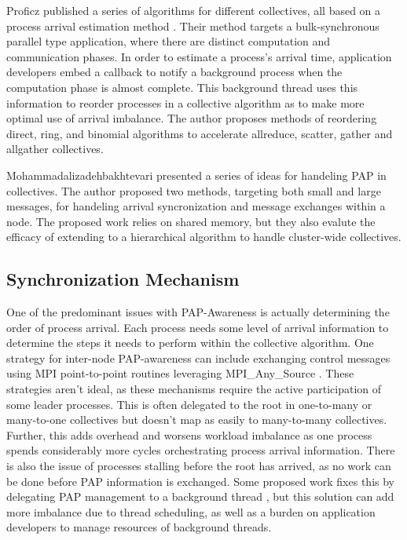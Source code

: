 Proficz published a series of algorithms for different collectives, all based on a process arrival estimation method \cite{Proficz2018ImprvAllReduceForImbPAP, Proficz2020PAPAwareScatterGather, Proficz2021AllGatherResilientToImbPAP}.
Their method targets a bulk-synchronous parallel type application, where there are distinct computation and communication phases.
In order to estimate a process's arrival time, application developers embed a callback to notify a background process when the computation phase is almost complete.
This background thread uses this information to reorder processes in a collective algorithm as to make more optimal use of arrival imbalance.
The author proposes methods of reordering direct, ring, and binomial algorithms to accelerate allreduce, scatter, gather and allgather collectives.

Mohammadalizadehbakhtevari \cite{Mohammadalizadehbakhtevari2021Thesis} presented a series of ideas for handeling PAP in collectives. 
The author proposed two methods, targeting both small and large messages, for handeling arrival syncronization and message exchanges within a node.
The proposed work relies on shared memory, but they also evalute the efficacy of extending to a hierarchical algorithm to handle cluster-wide collectives.

\subsection{Synchronization Mechanism}

One of the predominant issues with PAP-Awareness is actually determining the order of process arrival.
Each process needs some level of arrival information to determine the steps it needs to perform within the collective algorithm. 
One strategy for inter-node PAP-awareness can include exchanging control messages using MPI point-to-point routines leveraging MPI\_Any\_Source \cite{Patarasuk2008EffBcastDifProcArr}.
These strategies aren't ideal, as these mechanisms require the active participation of some leader processes.
This is often delegated to the root in one-to-many or many-to-one collectives but doesn't map as easily to many-to-many collectives.
Further, this adds overhead and worsens workload imbalance as one process spends considerably more cycles orchestrating process arrival information.
There is also the issue of processes stalling before the root has arrived, as no work can be done before PAP information is exchanged.
Some proposed work fixes this by delegating PAP management to a background thread \cite{Proficz2018ImprvAllReduceForImbPAP, Proficz2020PAPAwareScatterGather, Proficz2021AllGatherResilientToImbPAP, Faraj2008StudyProcArrivalMPIColl}, but this solution can add more imbalance due to thread scheduling, as well as a burden on application developers to manage resources of background threads.

